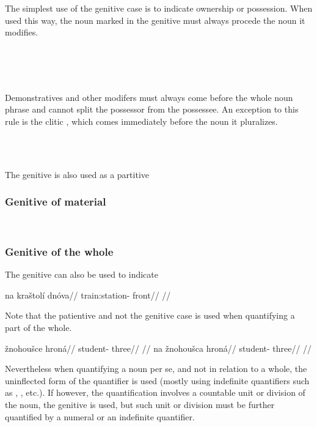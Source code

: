 The simplest use of the genitive case is to indicate ownership or possession.
When used this way, the noun marked in the genitive must always procede the noun
it modifies.

\pex
{}\\
\\
\\
\xe

Demonstratives and other modifers must always come before
the whole noun phrase and cannot split the possessor from the possessee. An
exception to this rule is the clitic , which comes immediately before
the noun it pluralizes.

\pex
\a  {}\\
\a  {}\\
\xe

The genitive is also used as a partitive 


\subsubsection{Genitive of material}

\ex
{}\\
\xe

\subsubsection{Genitive of the whole}
The genitive can also be used to indicate

\pex
\begingl
\gla na kraštolí dnóva//
\glb \Loc{} train:station-\Gen{} front//
\glft {}//
\endgl
\xe

Note that the patientive and not the genitive case is used when quantifying a part of the whole.

\pex
\a
\begingl
\gla *žnohoušce hroná//
\glb student-\Gen{} three//
\glft {}//
\endgl
\a
\begingl
\gla na žnohoušca hroná//
\glb \Loc{} student-\Gen{} three//
\glft {}//
\endgl
\xe

Nevertheless when quantifying a noun per se, and not in relation to a whole, the uninflected form of the quantifier is used (mostly using indefinite quantifiers such as , , etc.). If however, the quantification involves a countable unit or division of the noun, the genitive is used, but such unit or division must be further quantified by a numeral or an indefinite quantifier.

